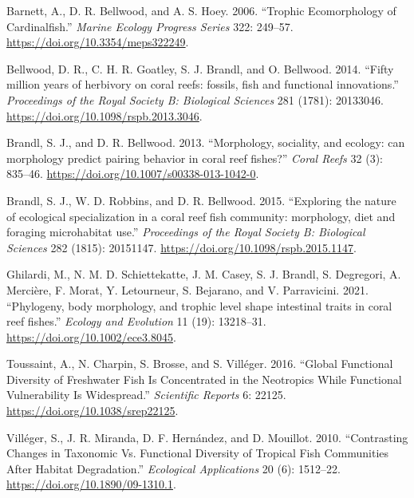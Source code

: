 \documentclass[
  letterpaper,
  DIV=11,
  numbers=noendperiod,
  oneside]{scrreprt}
\newlength{\cslhangindent}
\newlength{\cslentryspacingunit} %
\newenvironment{CSLReferences}[2] %
 {%
  \setlength{\parindent}{0pt}
  \ifodd #1
  \let\oldpar\par
  \def\par{\hangindent=\cslhangindent\oldpar}
  \fi
  \setlength{\parskip}{#2\cslentryspacingunit}
 }%
 {}
\begin{document}
\hypertarget{refs}{}
\begin{CSLReferences}{1}{0}
\leavevmode{}%
Barnett, A., D. R. Bellwood, and A. S. Hoey. 2006. {``Trophic
Ecomorphology of Cardinalfish.''} \emph{Marine Ecology Progress Series}
322: 249--57. \url{https://doi.org/10.3354/meps322249}.

\leavevmode{}%
Bellwood, D. R., C. H. R. Goatley, S. J. Brandl, and O. Bellwood. 2014.
{``{Fifty million years of herbivory on coral reefs: fossils, fish and
functional innovations}.''} \emph{Proceedings of the Royal Society B:
Biological Sciences} 281 (1781): 20133046.
\url{https://doi.org/10.1098/rspb.2013.3046}.

\leavevmode{}%
Brandl, S. J., and D. R. Bellwood. 2013. {``{Morphology, sociality, and
ecology: can morphology predict pairing behavior in coral reef
fishes?}''} \emph{Coral Reefs} 32 (3): 835--46.
\url{https://doi.org/10.1007/s00338-013-1042-0}.

\leavevmode{}%
Brandl, S. J., W. D. Robbins, and D. R. Bellwood. 2015. {``{Exploring
the nature of ecological specialization in a coral reef fish community:
morphology, diet and foraging microhabitat use}.''} \emph{Proceedings of
the Royal Society B: Biological Sciences} 282 (1815): 20151147.
\url{https://doi.org/10.1098/rspb.2015.1147}.

\leavevmode{}%
Ghilardi, M., N. M. D. Schiettekatte, J. M. Casey, S. J. Brandl, S.
Degregori, A. Mercière, F. Morat, Y. Letourneur, S. Bejarano, and V.
Parravicini. 2021. {``{Phylogeny, body morphology, and trophic level
shape intestinal traits in coral reef fishes}.''} \emph{Ecology and
Evolution} 11 (19): 13218--31. \url{https://doi.org/10.1002/ece3.8045}.

\leavevmode{}%
Toussaint, A., N. Charpin, S. Brosse, and S. Villéger. 2016. {``Global
Functional Diversity of Freshwater Fish Is Concentrated in the
Neotropics While Functional Vulnerability Is Widespread.''}
\emph{Scientific Reports} 6: 22125.
\url{https://doi.org/10.1038/srep22125}.

\leavevmode{}%
Villéger, S., J. R. Miranda, D. F. Hernández, and D. Mouillot. 2010.
{``Contrasting Changes in Taxonomic Vs. Functional Diversity of Tropical
Fish Communities After Habitat Degradation.''} \emph{Ecological
Applications} 20 (6): 1512--22. \url{https://doi.org/10.1890/09-1310.1}.

\end{CSLReferences}
\end{document}
